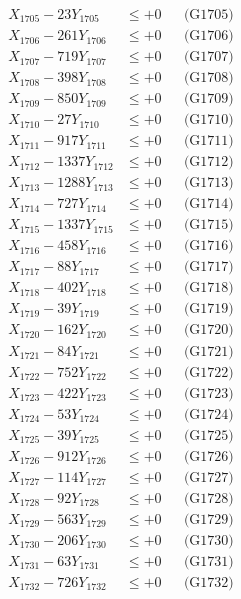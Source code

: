 \documentclass[a4paper,10pt]{article}
\begin{document}
{\begin{align}
X_{1705} - 23Y_{1705} &\leq +0 && \text{(G1705)} \\
X_{1706} - 261Y_{1706} &\leq +0 && \text{(G1706)} \\
X_{1707} - 719Y_{1707} &\leq +0 && \text{(G1707)} \\
X_{1708} - 398Y_{1708} &\leq +0 && \text{(G1708)} \\
X_{1709} - 850Y_{1709} &\leq +0 && \text{(G1709)} \\
X_{1710} - 27Y_{1710} &\leq +0 && \text{(G1710)} \\
\allowbreak
X_{1711} - 917Y_{1711} &\leq +0 && \text{(G1711)} \\
X_{1712} - 1337Y_{1712} &\leq +0 && \text{(G1712)} \\
X_{1713} - 1288Y_{1713} &\leq +0 && \text{(G1713)} \\
X_{1714} - 727Y_{1714} &\leq +0 && \text{(G1714)} \\
X_{1715} - 1337Y_{1715} &\leq +0 && \text{(G1715)} \\
X_{1716} - 458Y_{1716} &\leq +0 && \text{(G1716)} \\
X_{1717} - 88Y_{1717} &\leq +0 && \text{(G1717)} \\
X_{1718} - 402Y_{1718} &\leq +0 && \text{(G1718)} \\
X_{1719} - 39Y_{1719} &\leq +0 && \text{(G1719)} \\
X_{1720} - 162Y_{1720} &\leq +0 && \text{(G1720)} \\
\allowbreak
X_{1721} - 84Y_{1721} &\leq +0 && \text{(G1721)} \\
X_{1722} - 752Y_{1722} &\leq +0 && \text{(G1722)} \\
X_{1723} - 422Y_{1723} &\leq +0 && \text{(G1723)} \\
X_{1724} - 53Y_{1724} &\leq +0 && \text{(G1724)} \\
X_{1725} - 39Y_{1725} &\leq +0 && \text{(G1725)} \\
X_{1726} - 912Y_{1726} &\leq +0 && \text{(G1726)} \\
X_{1727} - 114Y_{1727} &\leq +0 && \text{(G1727)} \\
X_{1728} - 92Y_{1728} &\leq +0 && \text{(G1728)} \\
X_{1729} - 563Y_{1729} &\leq +0 && \text{(G1729)} \\
X_{1730} - 206Y_{1730} &\leq +0 && \text{(G1730)} \\
\allowbreak
X_{1731} - 63Y_{1731} &\leq +0 && \text{(G1731)} \\
X_{1732} - 726Y_{1732} &\leq +0 && \text{(G1732)} \\

\end{align}}
\end{document}
